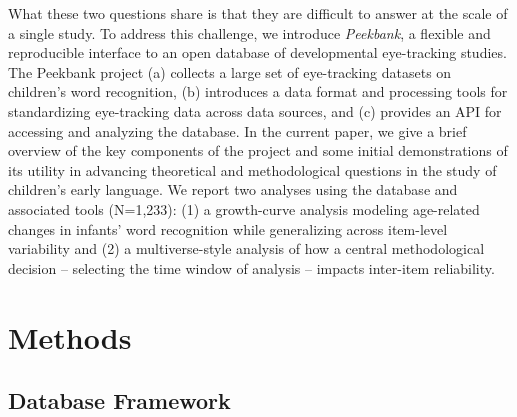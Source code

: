 \documentclass[10pt, letterpaper]{article}
\begin{document}
What these two questions share is that they are difficult to answer at
the scale of a single study. To address this challenge, we introduce
\emph{Peekbank}, a flexible and reproducible interface to an open
database of developmental eye-tracking studies. The Peekbank project (a)
collects a large set of eye-tracking datasets on children's word
recognition, (b) introduces a data format and processing tools for
standardizing eye-tracking data across data sources, and (c) provides an
API for accessing and analyzing the database. In the current paper, we
give a brief overview of the key components of the project and some
initial demonstrations of its utility in advancing theoretical and
methodological questions in the study of children's early language. We
report two analyses using the database and associated tools (N=1,233):
(1) a growth-curve analysis modeling age-related changes in infants'
word recognition while generalizing across item-level variability and
(2) a multiverse-style analysis of how a central methodological decision
-- selecting the time window of analysis -- impacts inter-item
reliability.

\hypertarget{methods}{%
\section{Methods}\label{methods}}

\hypertarget{database-framework}{%
\subsection{Database Framework}\label{database-framework}}
\end{document}
